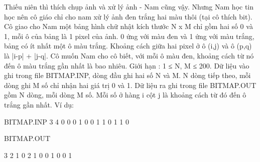 

Thiếu niên thì thích chụp ảnh và xử lý ảnh - Nam cũng vậy. Nhưng Nam học tin học nên
cô giáo chỉ cho nam xử lý ảnh đen trắng hai màu thôi (tại cô thích bit). Cô giao cho Nam
một bảng hình chữ nhật kích thước N x M chỉ gồm hai số 0 và 1, mỗi ô của bảng là 1
pixel của ảnh. 0 ứng với màu đen và 1 ứng với màu trắng, bảng có ít nhất một ô màu
trắng. Khoảng cách giữa hai pixel ở ô (i,j) và ô (p,q) là |i-p| + |j-q|. Cô muốn Nam cho cô
biết, với mỗi ô màu đen, khoảng cách từ nó đến ô màu trắng gần nhất là bao nhiêu.
Giới hạn : 1 ≤ N, M ≤ 200.
Dữ liệu vào ghi trong file BITMAP.INP, dòng đầu ghi hai số N và M. N dòng tiếp theo,
mỗi dòng ghi M số chỉ nhận hai giá trị 0 và 1.
Dữ liệu ra ghi trong file BITMAP.OUT gồm N dòng, mỗi dòng M số. Mỗi số ở hàng i cột
j là khoảng cách từ đó đến ô trắng gần nhất.
Ví dụ:

BITMAP.INP 
3 4
0 0 0 1
0 0 1 1
0 1 1 0

BITMAP.OUT

3 2 1 0
2 1 0 0
1 0 0 1
